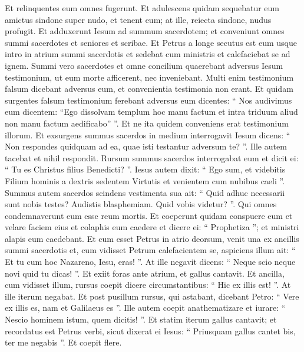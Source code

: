 \begin{biblechapter}
\begin{biblechapter}
\begin{biblechapter}
\begin{biblechapter}
\begin{biblechapter}
\begin{biblechapter}
\begin{biblechapter}
\begin{biblechapter}
\begin{biblechapter}
\begin{biblechapter}
\begin{biblechapter}
\begin{biblechapter}
\begin{biblechapter}
\begin{biblechapter}
 \verse Et relinquentes eum omnes fugerunt. 
\verse Et adulescens quidam sequebatur eum amictus sindone super nudo, et tenent eum; 
\verse at ille, reiecta sindone, nudus profugit.
 \verse Et adduxerunt Iesum ad summum sacerdotem; et conveniunt omnes summi sacerdotes et seniores et scribae. 
\verse Et Petrus a longe secutus est eum usque intro in atrium summi sacerdotis et sedebat cum ministris et calefaciebat se ad ignem. 
\verse Summi vero sacerdotes et omne concilium quaerebant adversus Iesum testimonium, ut eum morte afficerent, nec inveniebant. 
\verse Multi enim testimonium falsum dicebant adversus eum, et convenientia testimonia non erant. 
 \verse Et quidam surgentes falsum testimonium ferebant adversus eum dicentes: 
\verse “ Nos audivimus eum dicentem: “Ego dissolvam templum hoc manu factum et intra triduum aliud non manu factum aedificabo” ”. 
\verse Et ne ita quidem conveniens erat testimonium illorum. 
\verse Et exsurgens summus sacerdos in medium interrogavit Iesum dicens: “ Non respondes quidquam ad ea, quae isti testantur adversum te? ”. 
\verse Ille autem tacebat et nihil respondit. Rursum summus sacerdos interrogabat eum et dicit ei: “ Tu es Christus filius Benedicti? ”. 
 \verse Iesus autem dixit: “ Ego sum, et videbitis Filium hominis a dextris sedentem Virtutis et venientem cum nubibus caeli ”.
 \verse Summus autem sacerdos scindens vestimenta sua ait: “ Quid adhuc necessarii sunt nobis testes? 
\verse Audistis blasphemiam. Quid vobis videtur? ”. Qui omnes condemnaverunt eum esse reum mortis.
 \verse Et coeperunt quidam conspuere eum et velare faciem eius et colaphis eum caedere et dicere ei: “ Prophetiza ”; et ministri alapis eum caedebant.
 \verse Et cum esset Petrus in atrio deorsum, venit una ex ancillis summi sacerdotis 
\verse et, cum vidisset Petrum calefacientem se, aspiciens illum ait: “ Et tu cum hoc Nazareno, Iesu, eras! ”. 
\verse At ille negavit dicens: “ Neque scio neque novi quid tu dicas! ”. Et exiit foras ante atrium, et gallus cantavit. 
 \verse Et ancilla, cum vidisset illum, rursus coepit dicere circumstantibus: “ Hic ex illis est! ”. 
\verse At ille iterum negabat. Et post pusillum rursus, qui astabant, dicebant Petro: “ Vere ex illis es, nam et Galilaeus es ”. 
\verse Ille autem coepit anathematizare et iurare: “ Nescio hominem istum, quem dicitis! ”. 
 \verse Et statim iterum gallus cantavit; et recordatus est Petrus verbi, sicut dixerat ei Iesus: “ Priusquam gallus cantet bis, ter me negabis ”. Et coepit flere.
 

\end{biblechapter}
\end{biblechapter}
\end{biblechapter}
\end{biblechapter}
\end{biblechapter}
\end{biblechapter}
\end{biblechapter}
\end{biblechapter}
\end{biblechapter}
\end{biblechapter}
\end{biblechapter}
\end{biblechapter}
\end{biblechapter}
\end{biblechapter}
